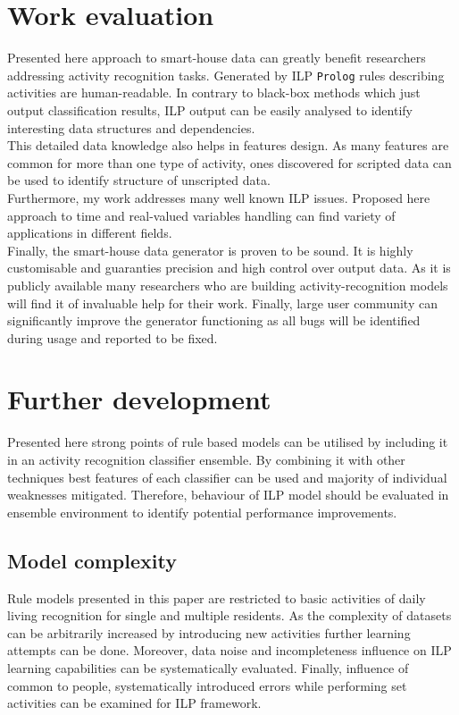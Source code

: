 \documentclass[11pt, a4paper, pdflatex, leqno, twoside, openright]{report}
\begin{document}
  \section{Work evaluation} %
Presented here approach to smart-house data can greatly benefit researchers addressing activity recognition tasks. Generated by ILP \texttt{Prolog} rules describing activities are human-readable. In contrary to black-box methods which just output classification results, ILP output can be easily analysed to identify interesting data structures and dependencies.\\
This detailed data knowledge also helps in features design. As many features are common for more than one type of activity, ones discovered for scripted data can be used to identify structure of unscripted data.\\

Furthermore, my work addresses many well known ILP issues. Proposed here approach to time and real-valued variables handling can find variety of applications in different fields.\\

Finally, the smart-house data generator is proven to be sound. It is highly customisable and guaranties precision and high control over output data. As it is publicly available many researchers who are building activity-recognition models will find it of invaluable help for their work. Finally, large user community can significantly improve the generator functioning as all bugs will be identified during usage and reported to be fixed.

  \section{Further development}
Presented here strong points of rule based models can be utilised by including it in an activity recognition classifier ensemble. By combining it with other techniques best features of each classifier can be used and majority of individual weaknesses mitigated. Therefore, behaviour of ILP model should be evaluated in ensemble environment to identify potential performance improvements.

    \subsection{Model complexity}
Rule models presented in this paper are restricted to basic activities of daily living recognition for single and multiple residents. As the complexity of datasets can be arbitrarily increased by introducing new activities further learning attempts can be done. Moreover, data noise and incompleteness influence on ILP learning capabilities can be systematically evaluated. Finally, influence of common to people, systematically introduced errors while performing set activities can be examined for ILP framework.
\end{document}
